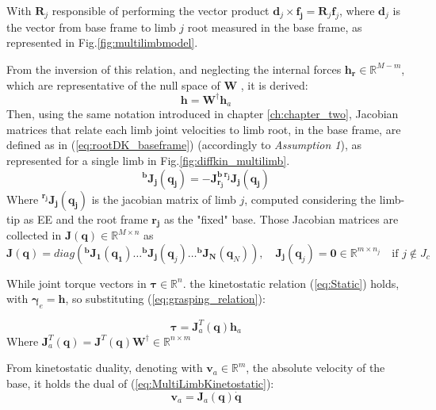With $\mathbf{R}_j$ responsible of performing the vector product $\mathbf{d}_j \times \mathbf{f_j} = \mathbf{R}_j\mathbf{f}_j$, where $\mathbf{d}_j$ is the vector from base frame to limb $j$ root measured in the base frame, as represented in Fig.\ref{fig:multilimbmodel}.

From the inversion of this relation,
and neglecting the internal forces $\mathbf{h_r} \in \mathbb{R}^{M-m}$, which are representative of the null space of $\mathbf{W}$ 
, it is derived: 
\begin{equation}
    \mathbf{h} = \mathbf{W}^\dag \mathbf{h}_a
    \label{eq:grasping_relation_rev}
\end{equation}
Then, using the same notation introduced in chapter \ref{ch:chapter_two}, Jacobian matrices that relate each limb joint velocities to limb root, in the base frame, are defined as in (\ref{eq:rootDK_baseframe}) (accordingly to \textit{Assumption 1}), as represented for a single limb in Fig.\ref{fig:diffkin_multilimb}.
\begin{equation}
    \label{eq:root_jacobian}
     \mathbf{^b J_j(q_j)} = - \mathbf{J^b_{r_j}}\mathbf{{^{r_j}J_j}(q_j)}
\end{equation}
Where $\mathbf{{^{r_j}J_j}(q_j)}$ is the jacobian matrix of limb $j$, computed considering the limb-tip as EE and the root frame $\mathbf{r_j}$ as the "fixed" base.  
Those Jacobian matrices are collected in 
$\mathbf{J}(\mathbf{q}) \in \mathbb{R}^{M \times n}$ as 
\begin{equation}
\label{eq:JacobianFormulaMultiLimb}
    \mathbf{J}(\mathbf{q}) = diag(\mathbf{^b J_1}(\mathbf{q_1}) \dots \mathbf{^b J_j}(\mathbf{q}_j) \dots \mathbf{^b J_N}(\mathbf{q}_N)) ,\quad
    \mathbf{J_j}(\mathbf{q}_j) = \mathbf{0} \in \mathbb{R}^{m\times n_j}  \quad \text{if } j\not \in J_c
\end{equation}

While joint torque vectors in $\mathbf{\tau} \in \mathbb{R}^n$.
the kinetostatic relation (\ref{eq:Static}) holds, with $\mathbf{\gamma}_e = \mathbf{h}$, so substituting (\ref{eq:grasping_relation}): 

\begin{equation}
    \mathbf{\tau} = \mathbf{J}^T_a(\mathbf{q})\mathbf{h}_a
    \label{eq:MultiLimbKinetostatic}
\end{equation}
Where $\mathbf{J}^T_a(\mathbf{q}) = \mathbf{J}^T(\mathbf{q})\mathbf{W}^\dag \in \mathbb{R}^{n\times m}$

From kinetostatic duality, denoting with $\mathbf{v}_a \in \mathbb{R}^m$, the absolute velocity of the base, it holds the dual of (\ref{eq:MultiLimbKinetostatic}): 
\begin{equation}
    \mathbf{v}_a = \mathbf{J}_a(\mathbf{q})\mathbf{\dot{q}}
    \label{eq:MultiLimbvel}
\end{equation}

